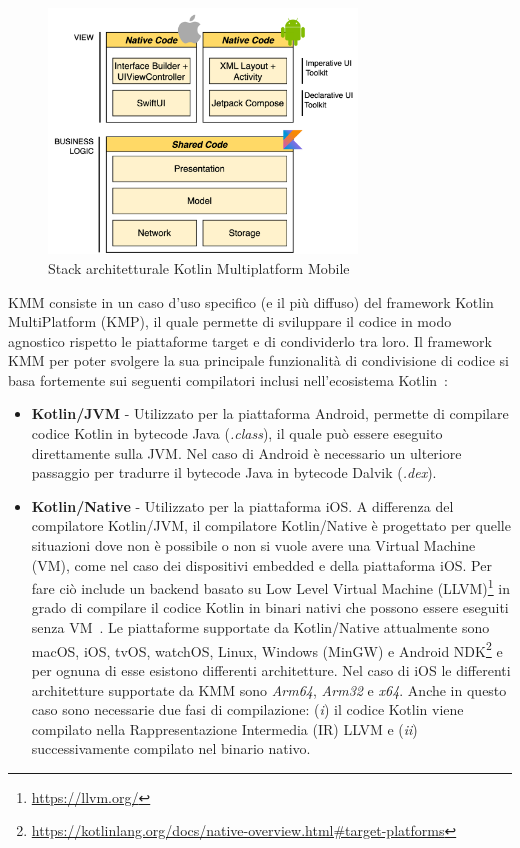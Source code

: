 \begin{figure}[H]
    \centering
    \includegraphics[width=0.73\textwidth]{img/stack_kmm.png}
    \caption{Stack architetturale Kotlin Multiplatform Mobile}
    \label{stackKMM}
\end{figure}

KMM consiste in un caso d'uso specifico (e il più diffuso) del framework Kotlin MultiPlatform (KMP),
il quale permette di sviluppare il codice in modo agnostico rispetto le piattaforme target e di condividerlo tra loro. 
Il framework KMM per poter svolgere la sua principale funzionalità di condivisione di codice si basa fortemente sui seguenti compilatori inclusi nell'ecosistema Kotlin~\cite{nagy2022simplifying}:

\begin{itemize}
    \item \textbf{Kotlin/JVM} - Utilizzato per la piattaforma Android, permette di compilare codice Kotlin in bytecode Java (\textit{.class}), il quale può essere eseguito direttamente sulla JVM. Nel caso di Android è necessario un ulteriore passaggio per tradurre il bytecode Java in bytecode Dalvik (\textit{.dex}).

    \item \textbf{Kotlin/Native} - Utilizzato per la piattaforma iOS. A differenza del compilatore Kotlin/JVM, il compilatore Kotlin/Native è progettato per quelle situazioni dove non è possibile o non si vuole avere una Virtual Machine (VM), come nel caso dei dispositivi embedded e della piattaforma iOS. Per fare ciò include un backend basato su Low Level Virtual Machine (LLVM)\footnote{\href{https://llvm.org/}{https://llvm.org/}} in grado di compilare il codice Kotlin in binari nativi che possono essere eseguiti senza VM~\cite{nagy2022simplifying}. Le piattaforme supportate da Kotlin/Native attualmente sono macOS, iOS, tvOS, watchOS, Linux, Windows (MinGW) e Android NDK\footnote{\href{https://kotlinlang.org/docs/native-overview.html\#target-platforms}{https://kotlinlang.org/docs/native-overview.html\#target-platforms}} e per ognuna di esse esistono differenti architetture. Nel caso di iOS le differenti architetture supportate da KMM sono \textit{Arm64}, \textit{Arm32} e \textit{x64}. Anche in questo caso sono necessarie due fasi di compilazione: (\textit{i}) il codice Kotlin viene compilato nella Rappresentazione Intermedia (IR) LLVM e (\textit{ii}) successivamente compilato nel binario nativo.
\end{itemize}

